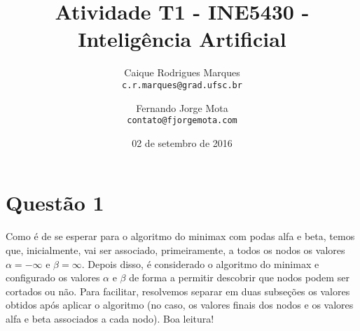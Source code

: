 \documentclass{article}
\title{\textbf{Atividade T1 - INE5430 - Inteligência Artificial}}
\author{
    Caique Rodrigues Marques \\
    {\texttt{c.r.marques@grad.ufsc.br}}
    \and
    Fernando Jorge Mota \\
    {\texttt{contato@fjorgemota.com}}
    \vspace{-5mm}
}
\date{02 de setembro de 2016}
\begin{document}
\maketitle

\section*{Questão 1}
    Como é de se esperar para o algoritmo do minimax com podas alfa e beta,
    temos que, inicialmente, vai ser associado, primeiramente, a todos os nodos
    os valores $\alpha=-\infty$ e $\beta=\infty$. Depois disso, é considerado o
    algoritmo do minimax e configurado os valores $\alpha$ e $\beta$ de forma a
    permitir descobrir que nodos podem ser cortados ou não. Para facilitar,
    resolvemos separar em duas subseções os valores obtidos após aplicar o
    algoritmo (no caso, os valores finais dos nodos e os valores alfa e beta
    associados a cada nodo). Boa leitura!
\end{document}
